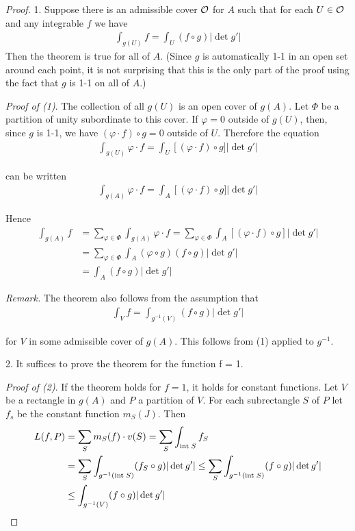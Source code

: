 \begin{proof}
1. Suppose there is an admissible cover $\mathcal{O}$ for $A$ such that
for each $U \in \mathcal{O}$ and any integrable $f$ we have
\begin{align*}
    \int_{g(U)} f = \int_U (f\circ g)|\det g'|
\end{align*}
Then the theorem is true for all of $A$. (Since $g$ is automatically 1-1 in an open set 
around each point, it is not surprising that this is the only part of the proof using the fact
that $g$ is 1-1 on all of $A$.)

\textit{Proof of (1)}. The collection of all $g(U)$ is an open cover of
$g(A)$. Let $\Phi$ be a partition of unity subordinate to this cover.
If $\varphi = 0$ outside of $g(U)$, then, since $g$ is 1-1, we have 
$(\varphi\cdot f)\circ g =0$ outside of $U$. Therefore the equation 
\begin{align*}
    \int_{{g}({U})}{\varphi}\cdot{f}=\int_{{U}}\left[({\varphi}\cdot{f})\circ{g}]\right|\det g'|
\end{align*}

can be written 
\begin{align*}
    \int_{{g}({A})}{\varphi}\cdot{f}=\int_{{A}}\left[({\varphi}\cdot{f})\circ{g}]\right|\det g'|
\end{align*}

Hence 
\begin{align*}
    \int_{g(A)}^{}{f} 
    & = \sum_{\varphi\in\Phi}^{}{\int_{g(A)} \varphi\cdot f} 
        = \sum_{\varphi\in\Phi}^{}{\int_A [(\varphi\cdot f)\circ g] |\det g'|} \\
    & = \sum_{\varphi\in\Phi}^{}{\int_A (\varphi\circ g)(f \circ g) |\det g'|}\\
    & = \int_A (f\circ g) |\det g'|
\end{align*}

\textit{Remark.} The theorem also follows from the assumption that
\begin{align*}
    \int_Vf = \int_{g^{-1}(V)} (f\circ g) |\det g'|
\end{align*}

for $V$ in some admissible cover of $g(A)$. This follows from (1)
applied to $g^{-1}$.

2. It suffices to prove the theorem for the function f = 1.\par 
\textit{Proof of (2)}. If the theorem holds for $f = 1$, it holds for
constant functions. Let $V$ be a rectangle in $g(A)$ and $P$ a 
partition of $V$. For each subrectangle $S$ of $P$ let $f_s$ be the 
constant function $m_S(J)$. Then
\begin{align*}
    L(f, P) 
    & = \sum_{S}^{}{m_S(f)\cdot v(S)} = \sum_{S }^{}{\int_{\mathrm{int}\; S} f_S} \\
    & = \sum_{S }^{}{\int_{g^{-1}(\mathrm{int}\; S)} (f_S\circ g)|\det g'|}
        \le \sum_{S}^{}{\int_{g^{-1}(\mathrm{int}\; S)} (f\circ g)|\det g'|} \\
    & \le \int_{g^{-1}(V)} (f\circ g)|\det g'|
\end{align*}


\end{proof}
